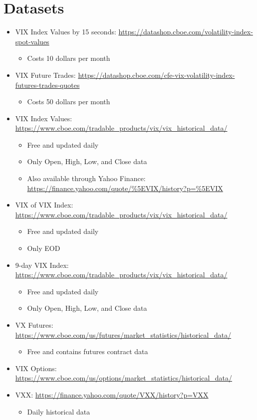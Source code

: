 \documentclass{article}
\begin{document}
\section*{Datasets}
\begin{itemize}
    \item VIX Index Values by 15 seconds: \url{https://datashop.cboe.com/volatility-index-spot-values}
    \begin{itemize}
        \item Costs 10 dollars per month
    \end{itemize}
    \item VIX Future Trades: \url{https://datashop.cboe.com/cfe-vix-volatility-index-futures-trades-quotes}
    \begin{itemize}
        \item Costs 50 dollars per month
    \end{itemize}
    \item VIX Index Values: \url{https://www.cboe.com/tradable_products/vix/vix_historical_data/}
    \begin{itemize}
        \item Free and updated daily
        \item Only Open, High, Low, and Close data
        \item Also available through Yahoo Finance: \url{https://finance.yahoo.com/quote/%5EVIX/history?p=%5EVIX}
    \end{itemize}
    \item VIX of VIX Index: \url{https://www.cboe.com/tradable_products/vix/vix_historical_data/}
    \begin{itemize}
        \item Free and updated daily
        \item Only EOD
    \end{itemize}
    \item 9-day VIX Index: \url{https://www.cboe.com/tradable_products/vix/vix_historical_data/}
    \begin{itemize}
        \item Free and updated daily
        \item Only Open, High, Low, and Close data
    \end{itemize}
    \item VX Futures: \url{https://www.cboe.com/us/futures/market_statistics/historical_data/}
    \begin{itemize}
        \item Free and contains futures contract data
    \end{itemize}
    \item VIX Options: \url{https://www.cboe.com/us/options/market_statistics/historical_data/}
    \item VXX: \url{https://finance.yahoo.com/quote/VXX/history?p=VXX}
    \begin{itemize}
        \item Daily historical data
    \end{itemize}
    
\end{itemize}
\end{document}
